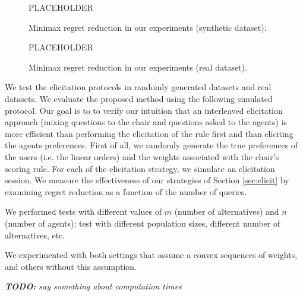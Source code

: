 \begin{figure}[t]
\begin{center}PLACEHOLDER\end{center}
\vspace{3.5cm}
\caption{Minimax regret reduction in our experiments (synthetic dataset).}
\end{figure}

\begin{figure}[t]
\begin{center}PLACEHOLDER\end{center}
\vspace{3.5cm}
\caption{Minimax regret reduction in our experiments (real dataset).}
\end{figure}

We test the elicitation protocols in randomly generated datasets and real datasets. %
We evaluate the proposed method using the following simulated protocol.
Our goal is to 
 to verify our intuition that an interleaved elicitation approach (mixing questions to the chair and questions asked to the agents) is more efficient than performing the elicitation of the rule first and than eliciting the agents preferences.
First of all, we randomly generate the true preferences of the users (i.e. the linear orders) and the weights associated with the chair's scoring rule.
For each of the elicitation strategy, we simulate an elicitation session.
We measure the effectiveness of our strategies of Section \ref{sec:elicit} by examining regret reduction as a function of the number of queries.

We performed tests with different values of $m$ (number of alternatives) and $n$ (number of agents); test with different population sizes, different number of alternatives, etc.

We experimented with both settings that assume a convex sequences of weights, and others without this assumption.

{\em {\bf TODO:} say something about computation times}


